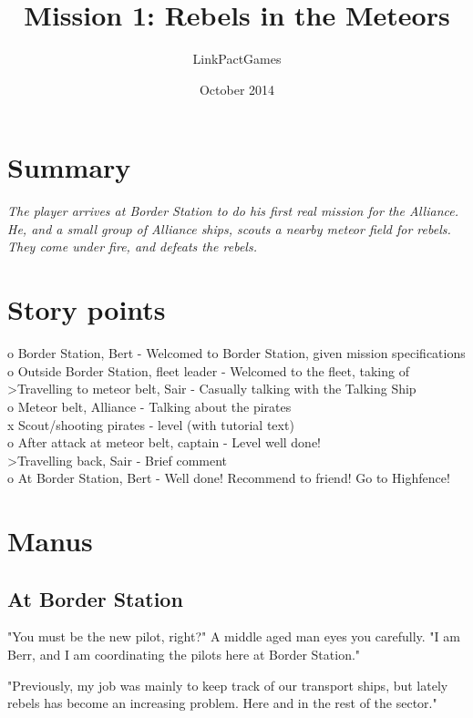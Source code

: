 \documentclass[a4paper,12pt]{article}
\begin{document}
\title{Mission 1: Rebels in the Meteors}
\author{LinkPactGames}
\date{October 2014}
\maketitle

\section{Summary}
\textit{The player arrives at Border Station to do his first real mission
for the Alliance. He, and a small group of Alliance ships, scouts a nearby meteor field
for rebels. They come under fire, and defeats the rebels.}

\section{Story points}

o Border Station, Bert - Welcomed to Border Station, given mission specifications\\
o Outside Border Station, fleet leader - Welcomed to the fleet, taking of\\
\textgreater  Travelling to meteor belt, Sair - Casually talking with the Talking Ship\\
o Meteor belt, Alliance - Talking about the pirates\\
x Scout/shooting pirates - level (with tutorial text)\\
o After attack at meteor belt, captain - Level well done!\\
\textgreater  Travelling back, Sair - Brief comment\\
o At Border Station, Bert - Well done! Recommend to friend! Go to Highfence!

\section{Manus}

\subsection{At Border Station}

"You must be the new pilot, right?" A middle aged man eyes you carefully.
"I am Berr, and I am coordinating the pilots here at Border Station."

"Previously, my job was mainly to keep track of our transport ships, but lately
rebels has become an increasing problem. Here and in the rest of the sector."
\end{document}
